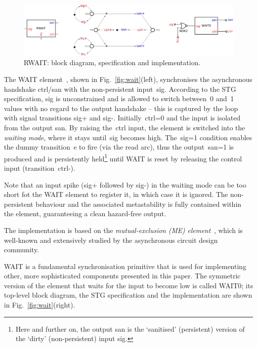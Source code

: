 \documentclass[conference]{IEEEtran}
\begin{document}
\begin{figure}
\begin{center}
    \includegraphics[scale=0.23]{fig/RWAIT.pdf}
    \caption{\textsf{RWAIT}: block diagram, specification and implementation.}
    \label{fig:rwait}
\end{center}
\end{figure}

The \textsf{WAIT} element~\cite{2015_sokolov_multiphase}, shown in Fig.~\ref{fig:wait}(left),
synchronises the asynchronous handshake \textsf{ctrl/san} with the non-persistent
input~\textsf{sig}. According to the STG specification, \textsf{sig} is unconstrained and
is allowed to switch between~0 and~1 values with no regard to the output handshake -- this
is captured by the loop with signal transitions \textsf{sig+} and \textsf{sig-}.
Initially~\textsf{ctrl=0} and the input is isolated from the output \textsf{san}.
By raising the~\textsf{ctrl} input, the element is switched into the \emph{waiting mode},
where it stays until~\textsf{sig} becomes high. The~\textsf{sig=1} condition enables the dummy
transition~\textsf{e} to fire (via the read arc), thus the output~\textsf{san=1} is produced
and is persistently held\footnote{Here and further on, the output \textsf{san}
is the `sanitised' (persistent) version of the `dirty' (non-persistent) input \textsf{sig}.}
until \textsf{WAIT} is reset by releasing the control input (transition~\textsf{ctrl-}).

Note that an input spike (\textsf{sig+} followed by \textsf{sig-}) in the waiting
mode can be too short fot the \textsf{WAIT} element to register it, in which case it is
ignored. The non-persistent behaviour and the associated metastability is fully contained
within the element, guaranteeing a clean hazard-free output.

The implementation is based on the \emph{mutual-exclusion (ME)
element}~\cite{2008_kinniment_synchronisation}, which is well-known and extensively
studied by the asynchronous circuit design community.

\textsf{WAIT} is a fundamental synchronisation primitive that is used for
implementing other, more sophisticated components presented in this paper.
The symmetric version of the element that waits for the input to become low is
called \textsf{WAIT0}; its top-level block diagram, the STG specification and
the implementation are shown in Fig.~\ref{fig:wait}(right).
\end{document}
